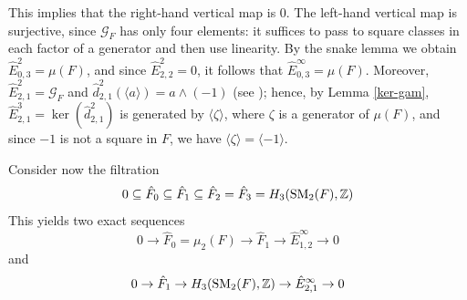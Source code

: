 \documentclass[11pt]{amsart}
\theoremstyle{definition}
\theoremstyle{plain}
\numberwithin{equation}{section}
\newcommand{\z}{\mathbb{Z}}
\newcommand{\GG}{\mathcal{G}}
\newcommand{\lan}{\langle}
\newcommand{\ran}{\rangle}
\newcommand{\arr}{\rightarrow}
\newcommand{\SM}{\mathit{{\rm SM}}}
\begin{document}
This implies that the right-hand vertical map is $0$. The left-hand vertical map is surjective, since $\GG_F$ has only four elements: it suffices to pass to square classes in each factor of a generator and then use linearity. By the snake lemma we obtain $\hat{E}^2_{0,3}=\mu(F)$, and since $\hat{E}^2_{2,2}=0$, it follows that $\hat{E}^{\infty}_{0,3}=\mu(F)$. Moreover, $\hat{E}^2_{2,1}=\GG_F$ and $\hat{d}^2_{2,1}(\lan a\ran)=a\wedge(-1)$ (see \cite[\S 5]{B-E--2023}); hence, by Lemma \ref{ker-gam}, $\hat{E}^3_{2,1}=\ker(\hat{d}^2_{2,1})$ is generated by $\lan\zeta\ran$, where $\zeta$ is a generator of $\mu(F)$, and since $-1$ is not a square in $F$, we have $\lan\zeta\ran=\lan-1\ran$. 

Consider now the filtration
\[
    0\subseteq \hat{F}_0\subseteq \hat{F}_1\subseteq \hat{F}_2= \hat{F}_3=H_3(\SM_2(F),\z)
\]
This yields two exact sequences
\begin{equation}
    \label{sq-sm2-1}
    0 \arr \hat{F}_0=\mu_2(F)\arr \hat{F}_1\arr \hat{E}^{\infty}_{1,2}\arr 0
\end{equation}
and
\begin{equation}
    \label{sq-sm2-2}
    0 \arr \hat{F}_1\arr H_3(\SM_2(F),\z)\arr \hat{E}^{\infty}_{2,1}\arr 0
\end{equation}
\end{document}
